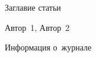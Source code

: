 
\begin{center}

  
{\titlefont
Заглавие статьи
}

{\authorfont
Автор~1,
Автор~2
}

\vspace{0.5cm}

{\publisherfont
Информация о~журнале
}

\vspace{0.5cm}

\end{center}
